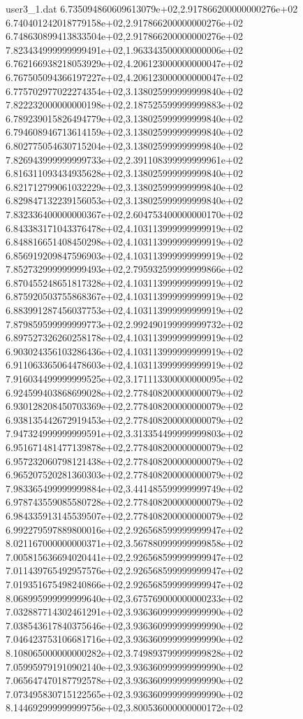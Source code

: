 \begin{filecontents}{user3_1.dat}
6.735094860609613079e+02,2.917866200000000276e+02
6.740401242018779158e+02,2.917866200000000276e+02
6.748630899413833504e+02,2.917866200000000276e+02
7.823434999999999491e+02,1.963343500000000006e+02
6.762166938218053929e+02,4.206123000000000047e+02
6.767505094366197227e+02,4.206123000000000047e+02
6.775702977022274354e+02,3.138025999999999840e+02
7.822232000000000198e+02,2.187525599999999883e+02
6.789239015826494779e+02,3.138025999999999840e+02
6.794608946713614159e+02,3.138025999999999840e+02
6.802775054630715204e+02,3.138025999999999840e+02
7.826943999999999733e+02,2.391108399999999961e+02
6.816311093434935628e+02,3.138025999999999840e+02
6.821712799061032229e+02,3.138025999999999840e+02
6.829847132239156053e+02,3.138025999999999840e+02
7.832336400000000367e+02,2.604753400000000170e+02
6.843383171043376478e+02,4.103113999999999919e+02
6.848816651408450298e+02,4.103113999999999919e+02
6.856919209847596903e+02,4.103113999999999919e+02
7.852732999999999493e+02,2.795932599999999866e+02
6.870455248651817328e+02,4.103113999999999919e+02
6.875920503755868367e+02,4.103113999999999919e+02
6.883991287456037753e+02,4.103113999999999919e+02
7.879859599999999773e+02,2.992490199999999732e+02
6.897527326260258178e+02,4.103113999999999919e+02
6.903024356103286436e+02,4.103113999999999919e+02
6.911063365064478603e+02,4.103113999999999919e+02
7.916034499999999525e+02,3.171113300000000095e+02
6.924599403868699028e+02,2.778408200000000079e+02
6.930128208450703369e+02,2.778408200000000079e+02
6.938135442672919453e+02,2.778408200000000079e+02
7.947324999999999591e+02,3.313354499999999803e+02
6.951671481477139878e+02,2.778408200000000079e+02
6.957232060798121438e+02,2.778408200000000079e+02
6.965207520281360303e+02,2.778408200000000079e+02
7.983365499999999884e+02,3.441485599999999749e+02
6.978743559085580728e+02,2.778408200000000079e+02
6.984335913145539507e+02,2.778408200000000079e+02
6.992279597889800016e+02,2.926568599999999947e+02
8.021167000000000371e+02,3.567880999999999858e+02
7.005815636694020441e+02,2.926568599999999947e+02
7.011439765492957576e+02,2.926568599999999947e+02
7.019351675498240866e+02,2.926568599999999947e+02
8.068995999999999640e+02,3.675769000000000233e+02
7.032887714302461291e+02,3.936360999999999990e+02
7.038543617840375646e+02,3.936360999999999990e+02
7.046423753106681716e+02,3.936360999999999990e+02
8.108065000000000282e+02,3.749893799999999828e+02
7.059959791910902140e+02,3.936360999999999990e+02
7.065647470187792578e+02,3.936360999999999990e+02
7.073495830715122565e+02,3.936360999999999990e+02
8.144692999999999756e+02,3.800536000000000172e+02

\end{filecontents}
